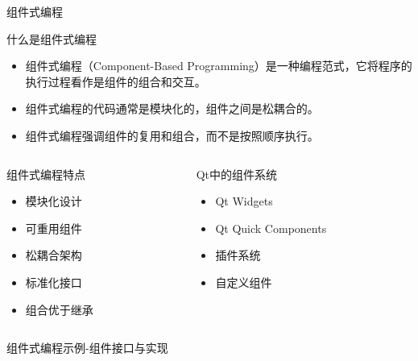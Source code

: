 \documentclass[UTF8,aspectratio=169]{beamer}
\begin{document}
\begin{frame}{组件式编程}
    \begin{ytublock}{什么是组件式编程}
        \begin{itemize}
            \item 组件式编程（Component-Based Programming）是一种编程范式，它将程序的执行过程看作是组件的组合和交互。
            \item 组件式编程的代码通常是模块化的，组件之间是松耦合的。
            \item 组件式编程强调组件的复用和组合，而不是按照顺序执行。
        \end{itemize}
    \end{ytublock}
    \begin{columns}
        \begin{column}{0.48\textwidth}
            \begin{ytublock}{组件式编程特点}
                \begin{itemize}
                    \item 模块化设计
                    \item 可重用组件
                    \item 松耦合架构
                    \item 标准化接口
                    \item 组合优于继承
                \end{itemize}
            \end{ytublock}
        \end{column}
        \begin{column}{0.48\textwidth}
            \begin{ytublock}{Qt中的组件系统}
                \begin{itemize}
                    \item Qt Widgets
                    \item Qt Quick Components
                    \item 插件系统
                    \item 自定义组件
                \end{itemize}
            \end{ytublock}
        \end{column}
    \end{columns}
\end{frame}

\begin{frame}[fragile]{组件式编程示例-组件接口与实现}
    \begin{columns}
        \begin{column}{0.48\textwidth}
            \inputminted[firstline=1,lastline=17]{cpp}{code/component_programming_1.cpp}
        \end{column}
        \begin{column}{0.48\textwidth}
            \inputminted[firstline=18,lastline=33]{cpp}{code/component_programming_1.cpp}
        \end{column}
    \end{columns}
\end{frame}
\end{document}

